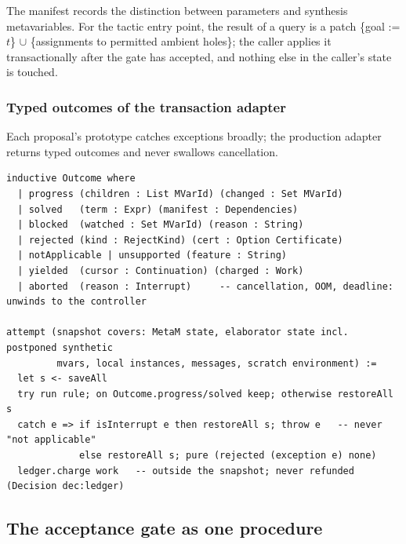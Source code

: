 The manifest records the distinction between parameters and synthesis metavariables. For the tactic entry point, the result of a query is a patch \{goal := $t$\} $\cup$ \{assignments to permitted ambient holes\}; the caller applies it transactionally after the gate has accepted, and nothing else in the caller's state is touched.

\subsubsection{Typed outcomes of the transaction adapter}

Each proposal's prototype catches exceptions broadly; the production adapter returns typed outcomes and never swallows cancellation.
\begin{lstlisting}
inductive Outcome where
  | progress (children : List MVarId) (changed : Set MVarId)
  | solved   (term : Expr) (manifest : Dependencies)
  | blocked  (watched : Set MVarId) (reason : String)
  | rejected (kind : RejectKind) (cert : Option Certificate)
  | notApplicable | unsupported (feature : String)
  | yielded  (cursor : Continuation) (charged : Work)
  | aborted  (reason : Interrupt)     -- cancellation, OOM, deadline: unwinds to the controller

attempt (snapshot covers: MetaM state, elaborator state incl. postponed synthetic
         mvars, local instances, messages, scratch environment) :=
  let s <- saveAll
  try run rule; on Outcome.progress/solved keep; otherwise restoreAll s
  catch e => if isInterrupt e then restoreAll s; throw e   -- never "not applicable"
             else restoreAll s; pure (rejected (exception e) none)
  ledger.charge work   -- outside the snapshot; never refunded (Decision dec:ledger)
\end{lstlisting}

\subsection{The acceptance gate as one procedure}\label{alg:gate}

